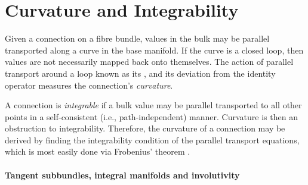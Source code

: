 \chapter{Curvature and Integrability}

Given a connection on a fibre bundle, values in the bulk may be parallel transported along a curve in the base manifold.
If the curve is a closed loop, then values are not necessarily mapped back onto themselves.
The action of parallel transport around a loop known as its , and its deviation from the identity operator measures the connection's \emph{curvature}.






A connection is \emph{integrable} if a bulk value may be parallel transported to all other points in a self-consistent (i.e., path-independent) manner.
Curvature is then an obstruction to integrability.
Therefore, the curvature of a connection may be derived by finding the integrability condition of the parallel transport equations, which is most easily done via Frobenius' theorem \cite[§6]{spivak1975dg}.

\subsubsection{Tangent subbundles, integral manifolds and involutivity}

